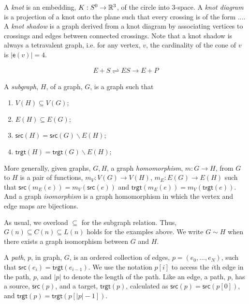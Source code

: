 \begin{example} \label{knotex}
  A \emph{knot} is an embedding, $K : S^0 \to \mathbb{R}^3$, of the circle
  into 3-space. A \emph{knot diagram} is a projection of a knot onto
  the plane such that every crossing is of the form .... A \emph{knot
    shadow} is a graph derived from a knot diagram by associating
  vertices to crossings and edges between connected crossings. Note
  that a knot shadow is always a tetravalent graph, i.e. for any
  vertex, $v$, the cardinality of the cone of $v$ is $|\textsf{e}(v)|
  = 4$.
\end{example}

\begin{example} \label{chemex}
  \begin{eqnarray}
    E + S \rightleftharpoons ES \rightarrow E + P
  \end{eqnarray}
\end{example}

\begin{definition}
  A \emph{subgraph}, $H$, of a graph, $G$, is a graph such that
  \begin{enumerate}
     \item $V(H) \subseteq V(G)$;
     \item $E(H) \subseteq E(G)$;
     \item $\textsf{src}(H) = \textsf{src}(G) \backslash E(H)$;
     \item $\textsf{trgt}(H) = \textsf{trgt}(G) \backslash E(H)$;
  \end{enumerate}
  More generally, given graphs, $G, H$, a graph \emph{homomorphism},
  $m: G \to H$, from $G$ to $H$ is a pair of functions, $m_V : V(G)
  \to V(H)$, $m_E : E(G) \to E(H)$ such that $\textsf{src}(m_E(e)) =
  m_V(\textsf{src}(e))$ and $\textsf{trgt}(m_E(e)) =
  m_V(\textsf{trgt}(e))$. And a graph \emph{isomorphism} is a graph
  homomorphism in which the vertex and edge maps are bijections.
\end{definition}

As usual, we overload $\subseteq$ for the subgraph relation. Thus,
$G(n) \subseteq C(n) \subseteq L(n)$ holds for the examples above. We
write $G \sim H$ when there exists a graph isomorphism between $G$ and
$H$.

\begin{definition}
  A \emph{path}, $p$, in graph, $G$, is an ordered collection of
  edges, $p = (e_0, ..., e_N)$, such that $\textsf{src}(e_i) =
  \textsf{trgt}(e_{i-1})$. We use the notation $p[i]$ to access the
  $i$th edge in the path, $p$, and $|p|$ to denote the length of the
  path. Like an edge, a path, $p$, has a source, $\textsf{src}(p)$,
  and a target, $\textsf{trgt}(p)$, calculated as $\textsf{src}(p) =
  \textsf{src}(p[0])$, and $\textsf{trgt}(p) =
  \textsf{trgt}(p[|p|-1])$.
\end{definition}

